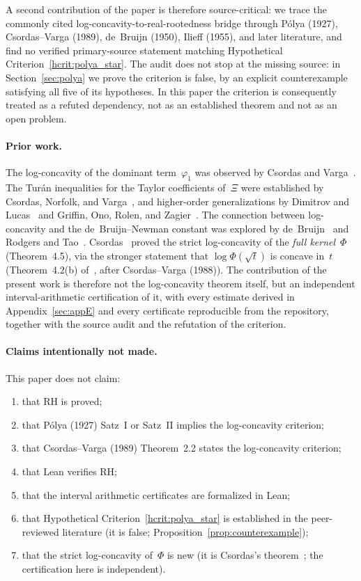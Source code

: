\documentclass[11pt]{article}
\theoremstyle{definition}
\theoremstyle{remark}
\begin{document}
A second contribution of the paper is therefore source-critical: we trace the commonly
cited log-concavity-to-real-rootedness bridge through P\'{o}lya (1927),
Csordas--Varga (1989), de~Bruijn (1950), Ilieff (1955), and later literature, and
find no verified primary-source statement matching
Hypothetical Criterion~\ref{hcrit:polya_star}.
The audit does not stop at the missing source: in
Section~\ref{sec:polya} we prove the criterion is false, by an explicit
counterexample satisfying all five of its hypotheses.
In this paper the criterion is consequently treated as a refuted
dependency, not as an established theorem and not as an open problem.

\paragraph{Prior work.}
The log-concavity of the dominant term~$\varphi_1$ was observed by Csordas and
Varga~\cite{csordas1989}.
The Tur\'{a}n inequalities for the Taylor coefficients of~$\Xi$ were established
by Csordas, Norfolk, and Varga~\cite{csordas1986}, and higher-order generalizations
by Dimitrov and Lucas~\cite{dimitrov2011} and Griffin, Ono, Rolen, and
Zagier~\cite{griffin2019}.
The connection between log-concavity and the de~Bruijn--Newman constant was explored
by de~Bruijn~\cite{debruijn1950} and Rodgers and Tao~\cite{rodgers2020}.
Csordas~\cite{csordas2015} proved the strict log-concavity of the
\emph{full kernel}~$\Phi$ (Theorem~4.5), via the stronger statement that
$\log\Phi(\sqrt{t})$ is concave in~$t$ (Theorem~4.2(b) of~\cite{csordas2015},
after Csordas--Varga (1988)).
The contribution of the present work is therefore not the log-concavity
theorem itself, but an independent interval-arithmetic certification of it,
with every estimate derived in Appendix~\ref{sec:appE} and every certificate
reproducible from the repository, together with the source audit and the
refutation of the criterion.

\paragraph{Claims intentionally not made.}
This paper does not claim:
\begin{enumerate}[leftmargin=2em,itemsep=1pt]
\item that RH is proved;
\item that P\'{o}lya (1927) Satz~I or Satz~II implies the log-concavity criterion;
\item that Csordas--Varga (1989) Theorem~2.2 states the log-concavity criterion;
\item that Lean verifies RH;
\item that the interval arithmetic certificates are formalized in Lean;
\item that Hypothetical Criterion~\ref{hcrit:polya_star} is established in the
peer-reviewed literature (it is false; Proposition~\ref{prop:counterexample});
\item that the strict log-concavity of~$\Phi$ is new (it is
Csordas's theorem~\cite[Theorem~4.5]{csordas2015}; the certification here
is independent).
\end{enumerate}
\end{document}
